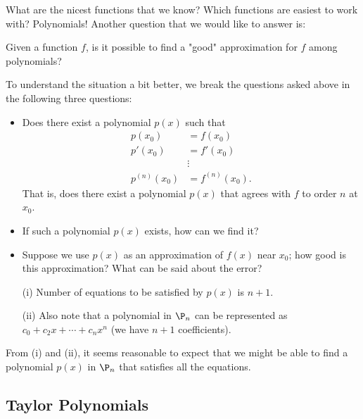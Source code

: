 What are the nicest functions that we know? Which functions are easiest to work with? Polynomials! Another question that we would like to answer is:
\begin{center}
    Given a function \( f \), is it possible to find a "good" approximation for \( f  \) among polynomials?
\end{center}

To understand the situation a bit better, we break the questions asked above in the following three questions:
\begin{itemize}
    \item Does there exist a polynomial \( p(x) \) such that 
        \begin{align*}
            p({x}_{0}) &= f({x}_{0}) \\
            p'({x}_{0}) &= f'({x}_{0}) \\
                        &\vdots \\
            p^{(n)}({x}_{0}) &= f^{(n)}({x}_{0}).
        \end{align*}
        That is, does there exist a polynomial \( p(x) \) that agrees with \( f  \) to order \( n  \) at \( {x}_{0} \).
    \item If such a polynomial \( p(x) \) exists, how can we find it? 
    \item Suppose we use \( p(x) \) as an approximation of \( f(x) \) near \( {x}_{0}  \); how good is this approximation? What can be said about the error?  
\end{itemize}

\begin{remark}
    \begin{enumerate}
        \item[(i)] Number of equations to be satisfied by \( p(x) \) is \( n + 1  \).
        \item[(ii)] Also note that a polynomial in \( {\P}_{n} \) can be represented as \( {c}_{0} + {c}_{2} x + \cdots + {c}_{n} x^{n} \) (we have \( n + 1  \) coefficients).  
    \end{enumerate}
    From (i) and (ii), it seems reasonable to expect that we might be able to find a polynomial \( p(x) \) in \( {\P}_{n} \) that satisfies all the equations. 
\end{remark}

\subsection{Taylor Polynomials}\label{Taylor Polynomials}

